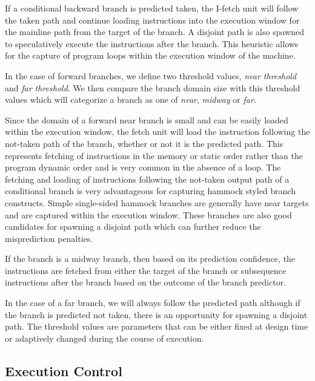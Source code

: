 \documentclass[10pt,twocolumn]{IEEEtran}
\begin{document}
If a conditional backward branch is predicted taken, the I-fetch unit
will follow the taken path and continue loading instructions into the
execution window for the mainline path from the target of the branch.
A disjoint path is also spawned to speculatively execute the
instructions after the branch.  This heuristic allows for the capture
of program loops within the execution window of the machine.

In the case of forward branches, we define two threshold values,
\emph{near threshold} and \emph{far threshold}.  We then compare the
branch domain size with this threshold values which will categorize a
branch as one of \emph{near}, \emph{midway} or \emph{far}.

Since the domain of a forward near branch is small and can be easily
loaded within the execution window, the fetch unit will load the
instruction following the not-taken path of the branch, whether or not
it is the predicted path.  This represents fetching of instructions in
the memory or static order rather than the program dynamic order and is
very common in the absence of a loop.  The fetching and loading of
instructions following the not-taken output path of a conditional
branch is very advantageous for capturing hammock styled branch
constructs.  Simple single-sided hammock branches are generally have
near targets and are captured within the execution window.  These
branches are also good candidates for spawning a disjoint path which
can further reduce the misprediction penalties.

If the branch is a midway branch, then based on its prediction
confidence, the instructions are fetched from either the target of the
branch or subsequence instructions after the branch based on the
outcome of the branch predictor.

In the case of a far branch, we will always follow the predicted path
although if the branch is predicted not taken, there is an opportunity
for spawning a disjoint path.
The threshold values are parameters that can be either fixed at 
design time or adaptively changed during the course of execution. 

\subsection {Execution Control}
\end{document}
